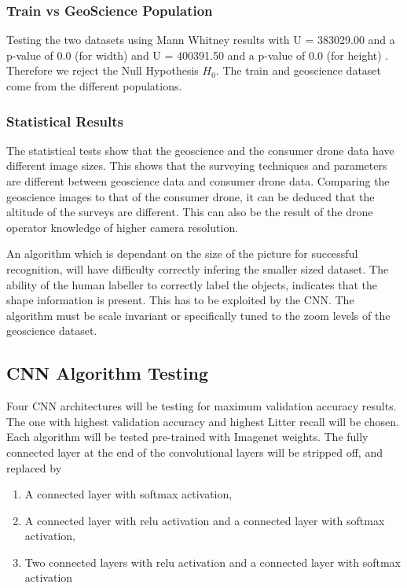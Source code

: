 \documentclass{IEEEtran}
\begin{document}
\subsubsection{Train vs GeoScience Population}

Testing the two datasets using Mann Whitney results with U = 383029.00 and a p-value of 0.0 (for width) and U = 400391.50 and a p-value of 0.0 (for height) . Therefore we reject the Null Hypothesis $H_0$. The train and geoscience dataset come from the different populations. 

\subsubsection{Statistical Results}

The statistical tests show that the geoscience and the consumer drone data have different image sizes. This shows that the surveying techniques and parameters are different between geoscience data and consumer drone data. Comparing the geoscience images to that of the consumer drone, it can be deduced that the altitude of the surveys are different. This can also be the result of the drone operator knowledge of higher camera resolution.\newline

An algorithm which is dependant on the size of the picture for successful recognition, will have difficulty correctly infering the smaller sized dataset. The ability of the human labeller to correctly label the objects, indicates that the shape information is present. This has to be exploited by the CNN. The algorithm must be scale invariant or specifically tuned to the zoom levels of the geoscience dataset.\newline

\subsection{CNN Algorithm Testing}

Four CNN architectures will be testing for maximum validation accuracy results. The one with highest validation accuracy and highest Litter recall will be chosen. Each algorithm will be tested pre-trained with Imagenet weights. The fully connected layer at the end of the convolutional layers will be stripped off, and replaced by
\begin{enumerate}
\item A connected layer with softmax activation,
\item A connected layer with relu activation and a connected layer with softmax activation,
\item Two connected layers with relu activation and a connected layer with softmax activation
\end{enumerate}
\end{document}

